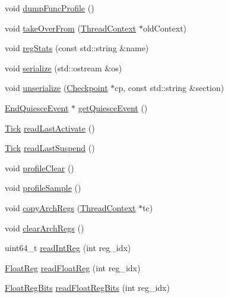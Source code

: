 \begin{DoxyCompactItemize}
void \hyperlink{classCheckerThreadContext_a13fa12d1779a94a1e0b968946a1367c7}{dumpFuncProfile} ()
\item 
void \hyperlink{classCheckerThreadContext_a5811640aa3008d2916f3d3aba621b82d}{takeOverFrom} (\hyperlink{classThreadContext}{ThreadContext} $\ast$oldContext)
\item 
void \hyperlink{classCheckerThreadContext_a3dd3443357312bcb75580eaa508c48a4}{regStats} (const std::string \&name)
\item 
void \hyperlink{classCheckerThreadContext_a53e036786d17361be4c7320d39c99b84}{serialize} (std::ostream \&os)
\item 
void \hyperlink{classCheckerThreadContext_af22e5d6d660b97db37003ac61ac4ee49}{unserialize} (\hyperlink{classCheckpoint}{Checkpoint} $\ast$cp, const std::string \&section)
\item 
\hyperlink{classEndQuiesceEvent}{EndQuiesceEvent} $\ast$ \hyperlink{classCheckerThreadContext_a0546f73d19db75274e9d0bc63c5f5908}{getQuiesceEvent} ()
\item 
\hyperlink{base_2types_8hh_a5c8ed81b7d238c9083e1037ba6d61643}{Tick} \hyperlink{classCheckerThreadContext_afaa8f9eb8d809cccd31829ba793a433a}{readLastActivate} ()
\item 
\hyperlink{base_2types_8hh_a5c8ed81b7d238c9083e1037ba6d61643}{Tick} \hyperlink{classCheckerThreadContext_a7d0b0631c7087d361f6ae11379c06b15}{readLastSuspend} ()
\item 
void \hyperlink{classCheckerThreadContext_acf9c88860776d7bd752317e8b550a5d5}{profileClear} ()
\item 
void \hyperlink{classCheckerThreadContext_aba547b904bdcf83196f983f79d285caf}{profileSample} ()
\item 
void \hyperlink{classCheckerThreadContext_a01b372f805c92c90e6148b76d23d6236}{copyArchRegs} (\hyperlink{classThreadContext}{ThreadContext} $\ast$tc)
\item 
void \hyperlink{classCheckerThreadContext_ad5c88ea41846742bd8c70d9c50f31945}{clearArchRegs} ()
\item 
uint64\_\-t \hyperlink{classCheckerThreadContext_a21c850cd41ab977a2cf3450fe66ec25a}{readIntReg} (int reg\_\-idx)
\item 
\hyperlink{classThreadContext_a75484259f1855aabc8d74c6eb1cfe186}{FloatReg} \hyperlink{classCheckerThreadContext_a2f97d83baef4fbda00b7f7f62779752f}{readFloatReg} (int reg\_\-idx)
\item 
\hyperlink{classThreadContext_aab5eeae86499f9bfe15ef79360eccc64}{FloatRegBits} \hyperlink{classCheckerThreadContext_a4998e6615f835676762af364eff198e3}{readFloatRegBits} (int reg\_\-idx)

\end{DoxyCompactItemize}
